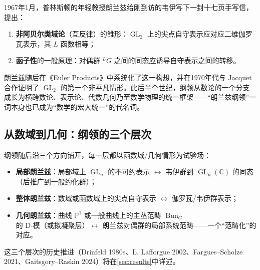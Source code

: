 1967年1月，普林斯顿的年轻教授朗兰兹给刚到访的韦伊写下一封十七页手写信\cite{langlands1967}，提出：

\begin{enumerate}[label=(\arabic*)]
    \item \textbf{非阿贝尔类域论}（互反律）的雏形：$\operatorname{GL}_2$ 上的尖点自守表示应对应二维伽罗瓦表示，其 $L$ 函数相等；
    \item \textbf{函子性}的一般原理：对偶群 $^LG$ 之间的同态应诱导自守表示之间的转移。
\end{enumerate}

朗兰兹随后在《Euler Products》\cite{langlands1971}中系统化了这一构想，并在1970年代与 Jacquet 合作证明了 $\operatorname{GL}_2$ 的第一个非平凡情形\cite{jacquet1970}。此后半个世纪，纲领从数论的一个分支成长为横跨数论、表示论、代数几何乃至数学物理的统一框架——“朗兰兹纲领”一词本身也已成为“数学的宏大统一”的代名词。

\subsection{从数域到几何：纲领的三个层次}

纲领随后沿三个方向铺开，每一层都以函数域/几何情形为试验场：

\begin{itemize}
    \item \textbf{局部朗兰兹}：局部域上 $\operatorname{GL}_n$ 的不可约表示 $\leftrightarrow$ 韦伊群到 $\operatorname{GL}_n(\mathbb{C})$ 的同态（后推广到一般约化群）；
    \item \textbf{整体朗兰兹}：数域或函数域上的尖点自守表示 $\leftrightarrow$ 伽罗瓦/韦伊群表示；
    \item \textbf{几何朗兰兹}：曲线 $\mathbb{P}^1$ 或一般曲线上的主丛范畴 $\operatorname{Bun}_G$ 的 D-模（或拟凝聚层）$\leftrightarrow$ 朗兰兹对偶群的局部系统范畴——一个“范畴化”的对应。
\end{itemize}

这三个层次的历史推进（Drinfeld 1980s、L. Lafforgue 2002、Fargues--Scholze 2021、Gaitsgory--Raskin 2024）将在\cref{sec:results}中详述。

